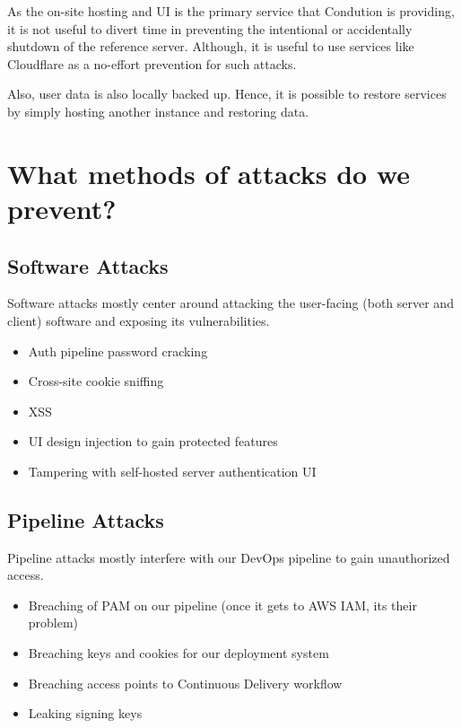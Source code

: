 \documentclass[letterpaper]{article}
\begin{document}
As the on-site hosting and UI is the primary service that Condution is providing, it is not useful to divert time in preventing the intentional or accidentally shutdown of the reference server. Although, it is useful to use services like Cloudflare as a no-effort prevention for such attacks.

Also, user data is also locally backed up. Hence, it is possible to restore services by simply hosting another instance and restoring data.

\section{What methods of attacks do we prevent?}
\label{sec:org925a0df}

\subsection{Software Attacks}
\label{sec:org8136918}
Software attacks mostly center around attacking the user-facing (both server and client) software and exposing its vulnerabilities.

\begin{itemize}
\item Auth pipeline password cracking
\item Cross-site cookie sniffing
\item XSS
\item UI design injection to gain protected features
\item Tampering with self-hosted server authentication UI
\end{itemize}

\subsection{Pipeline Attacks}
\label{sec:orgba5d578}
Pipeline attacks mostly interfere with our DevOps pipeline to gain unauthorized access.

\begin{itemize}
\item Breaching of PAM on our pipeline (once it gets to AWS IAM, its their problem)
\item Breaching keys and cookies for our deployment system
\item Breaching access points to Continuous Delivery workflow
\item Leaking signing keys
\end{itemize}
\end{document}
